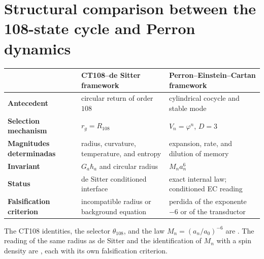 \section{Structural comparison between the 108-state cycle and Perron dynamics}

\begin{center}
\begin{tabularx}{\textwidth}{>{\bfseries}p{29mm}XX}
\toprule
& CT108--de Sitter framework & Perron--Einstein--Cartan framework\\
\midrule
Antecedent & circular return of order \(108\) & cylindrical cocycle and stable mode\\
Selection mechanism & \(r_g=R_{108}\) & \(V_n=\varphi^n\), \(D=3\)\\
Magnitudes determinadas & radius, curvature, temperature, and entropy & expansion, rate, and dilution of memory\\
Invariant & \(G_a\hbar_a\) and circular radius & \(M_na_n^6\)\\
Status & de Sitter conditioned interface & exact internal law; conditioned EC reading\\
Falsification criterion & incompatible radius or background equation & perdida of the exponente \(-6\) or of the transductor\\
\bottomrule
\end{tabularx}
\end{center}

\begin{statusbox}
The CT108 identities, the selector \(\theta_{108}\), and the law
\(M_n=(a_n/a_0)^{-6}\) are . The reading of the same radius
as de Sitter and the identification of \(M_n\) with a spin density are
, each with its own falsification criterion.
\end{statusbox}
